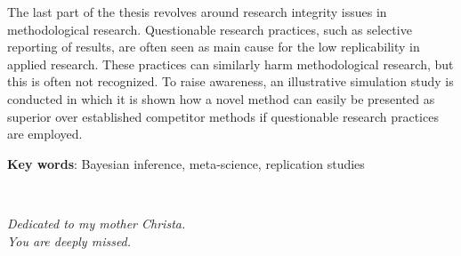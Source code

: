 The last part of the thesis revolves around research integrity issues in
methodological research. Questionable research practices, such as selective
reporting of results, are often seen as main cause for the low replicability in
applied research. These practices can similarly harm methodological research,
but this is often not recognized. To raise awareness, an illustrative simulation
study is conducted in which it is shown how a novel method can easily be
presented as superior over established competitor methods if questionable
research practices are employed.


\textbf{Key words}: Bayesian inference, meta-science, replication studies


\newpage ~

\newpage



\begin{center}
  \vspace*{5cm}

  \textit{Dedicated to my mother Christa. \\
    You are deeply missed.}
\end{center}
